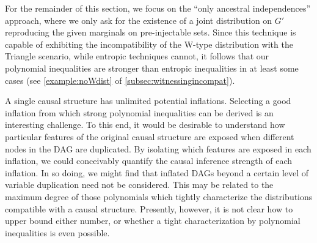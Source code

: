 \documentclass[aps,english,superscriptaddress,onecolumn,twoside,longbibliography,pra,floatfix,fleqn,nofootinbib]{revtex4-1}%
\theoremstyle{definition}
\begin{document}
For the remainder of this section, we focus on the ``only ancestral independences'' approach, where we only ask for the existence of a joint distribution on $G'$ reproducing the given marginals on pre-injectable sets.
Since this technique is capable of exhibiting the incompatibility of the W-type distribution with the Triangle scenario, while entropic techniques cannot, it follows that our polynomial inequalities are stronger than entropic inequalities in at least some cases (see \cref{example:noWdist} of \cref{subsec:witnessingincompat}).   

A single causal structure has unlimited potential inflations. Selecting a good inflation from which strong polynomial inequalities can be derived is an interesting challenge. To this end, it would be desirable to understand how particular features of the original causal structure are exposed when different nodes in the DAG are duplicated. By isolating which features are exposed in each inflation, we could conceivably quantify the causal inference strength of each inflation. In so doing, we might find that inflated DAGs beyond a certain level of variable duplication need not be considered. This may be related to the maximum degree of those polynomials which tightly characterize the distributions compatible with a causal structure. Presently, however, it is not clear how to upper bound either number, or whether a tight characterization by polynomial inequalities is even possible.



\end{document}
